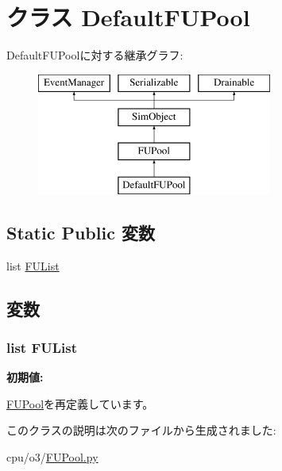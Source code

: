 \hypertarget{classFUPool_1_1DefaultFUPool}{
\section{クラス DefaultFUPool}
\label{classFUPool_1_1DefaultFUPool}
}
DefaultFUPoolに対する継承グラフ:\begin{figure}[H]
\begin{center}
\leavevmode
\includegraphics[height=4cm]{classFUPool_1_1DefaultFUPool}
\end{center}
\end{figure}
\subsection*{Static Public 変数}
\begin{DoxyCompactItemize}
\item 
list \hyperlink{classFUPool_1_1DefaultFUPool_a6187893abba0317192a9d839f42ab478}{FUList}
\end{DoxyCompactItemize}


\subsection{変数}
\hypertarget{classFUPool_1_1DefaultFUPool_a6187893abba0317192a9d839f42ab478}{
\subsubsection[{FUList}]{\setlength{\rightskip}{0pt plus 5cm}list {\bf FUList}}}
\label{classFUPool_1_1DefaultFUPool_a6187893abba0317192a9d839f42ab478}
{\bfseries 初期値:}
\begin{DoxyCode}
\end{DoxyCode}


\hyperlink{classFUPool_1_1FUPool_a82873a213d944933f9899d3ad30cb8cd}{FUPool}を再定義しています。

このクラスの説明は次のファイルから生成されました:\begin{DoxyCompactItemize}
\item 
cpu/o3/\hyperlink{FUPool_8py}{FUPool.py}\end{DoxyCompactItemize}
